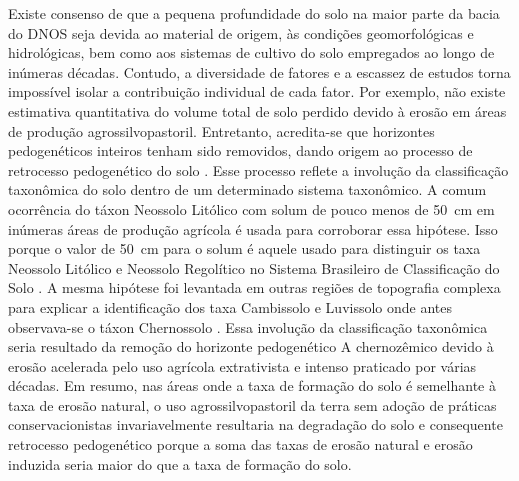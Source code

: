 Existe consenso de que a pequena profundidade do solo na maior parte da bacia do DNOS seja devida ao material 
de origem, às condições geomorfológicas e hidrológicas, bem como aos sistemas de cultivo do solo empregados ao 
longo de inúmeras décadas. Contudo, a diversidade de fatores e a escassez de estudos torna impossível isolar a 
contribuição individual de cada fator. Por exemplo, não existe estimativa quantitativa do volume total de solo 
perdido devido à erosão em áreas de produção agrossilvopastoril. Entretanto, acredita-se que horizontes 
pedogenéticos inteiros tenham sido removidos, dando origem ao processo de retrocesso pedogenético do solo
\cite{SamuelRosaEtAl2011a}. Esse processo reflete a involução da classificação taxonômica do solo dentro de um 
determinado sistema taxonômico. A comum ocorrência do táxon Neossolo Litólico com solum de pouco menos de 
\SI{50}{\cm} em inúmeras áreas de produção agrícola é usada para corroborar essa hipótese. Isso porque o valor 
de \SI{50}{\cm} para o solum é aquele usado para distinguir os taxa Neossolo Litólico e Neossolo Regolítico no 
Sistema Brasileiro de Classificação do Solo \cite{SantosEtAl2013a}. A mesma hipótese foi levantada em outras 
regiões de topografia complexa para explicar a identificação dos taxa Cambissolo e Luvissolo onde antes 
observava-se o táxon Chernossolo \cite{StreckEtAl2008}. Essa involução da classificação taxonômica seria 
resultado da remoção do horizonte pedogenético A chernozêmico devido à erosão acelerada pelo uso agrícola 
extrativista e intenso praticado por várias décadas. Em resumo, nas áreas onde a taxa de formação do solo é 
semelhante à taxa de erosão natural, o uso agrossilvopastoril da terra sem adoção de práticas 
conservacionistas invariavelmente resultaria na degradação do solo e consequente retrocesso pedogenético 
porque a soma das taxas de erosão natural e erosão induzida seria maior do que a taxa de formação do solo.

